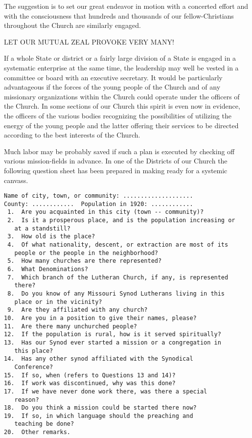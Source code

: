 \documentclass[
]{book}
\begin{document}
The suggestion is to set our great endeavor in motion with a concerted effort and with the consciousness that hundreds and thousands of our fellow-Christians throughout the Church are similarly engaged.

LET OUR MUTUAL ZEAL PROVOKE VERY MANY!

If a whole State or district or a fairly large division of a State is engaged in a systematic enterprise at the same time, the leadership may well be vested in a committee or board with an executive secretary. It would be particularly advantageous if the forces of the young people of the Church and of any missionary organizations within the Church could operate under the officers of the Church. In some sections of our Church this spirit is even now in evidence, the officers of the various bodies recognizing the possibilities of utilizing the energy of the young people and the latter offering their services to be directed according to the best interests of the Church.

Much labor may be probably saved if such a plan is executed by checking off various mission-fields in advance. In one of the Districts of our Church the following question sheet has been prepared in making ready for a systemic canvass.

\begin{verbatim}
Name of city, town, or community: ....................
County: ............  Population in 1920: ............
 1.  Are you acquainted in this city (town -- community)?
 2.  Is it a prosperous place, and is the population increasing or
   at a standstill?
 3.  How old is the place?  
 4.  Of what nationality, descent, or extraction are most of its
   people or the people in the neighborhood?
 5.  How many churches are there represented?
 6.  What Denominations?
 7.  Which branch of the Lutheran Church, if any, is represented
   there?
 8.  Do you know of any Missouri Synod Lutherans living in this
   place or in the vicinity?
 9.  Are they affiliated with any church?
10.  Are you in a position to give their names, please?
11.  Are there many unchurched people?
12.  If the population is rural, how is it served spiritually?
13.  Has our Synod ever started a mission or a congregation in
   this place?
14.  Has any other synod affiliated with the Synodical 
   Conference?
15.  If so, when (refers to Questions 13 and 14)?
16.  If work was discontinued, why was this done?
17.  If we have never done work there, was there a special
   reason?
18.  Do you think a mission could be started there now?
19.  If so, in which language should the preaching and 
   teaching be done?
20.  Other remarks.
\end{verbatim}
\end{document}
